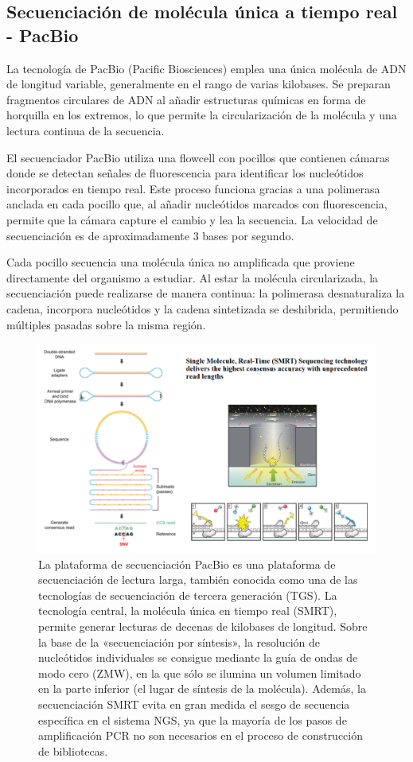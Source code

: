 \begin{itemize}
\section{Secuenciación de molécula única a tiempo real - PacBio}
La tecnología de PacBio (Pacific Biosciences) emplea una única molécula de ADN de longitud variable, generalmente en el rango de varias kilobases. Se preparan fragmentos circulares de ADN al añadir estructuras químicas en forma de horquilla en los extremos, lo que permite la circularización de la molécula y una lectura continua de la secuencia.

El secuenciador PacBio utiliza una flowcell con pocillos que contienen cámaras donde se detectan señales de fluorescencia para identificar los nucleótidos incorporados en tiempo real. Este proceso funciona gracias a una polimerasa anclada en cada pocillo que, al añadir nucleótidos marcados con fluorescencia, permite que la cámara capture el cambio y lea la secuencia. La velocidad de secuenciación es de aproximadamente 3 bases por segundo.

Cada pocillo secuencia una molécula única no amplificada que proviene directamente del organismo a estudiar. Al estar la molécula circularizada, la secuenciación puede realizarse de manera continua: la polimerasa desnaturaliza la cadena, incorpora nucleótidos y la cadena sintetizada se deshibrida, permitiendo múltiples pasadas sobre la misma región.

\begin{figure}[htbp]
\centering
\includegraphics[width = \textwidth]{figs/pacbio.png}
\caption{La plataforma de secuenciación PacBio es una plataforma de secuenciación de lectura larga, también conocida como una de las tecnologías de secuenciación de tercera generación (TGS). La tecnología central, la molécula única en tiempo real (SMRT), permite generar lecturas de decenas de kilobases de longitud. Sobre la base de la «secuenciación por síntesis», la resolución de nucleótidos individuales se consigue mediante la guía de ondas de modo cero (ZMW), en la que sólo se ilumina un volumen limitado en la parte inferior (el lugar de síntesis de la molécula). Además, la secuenciación SMRT evita en gran medida el sesgo de secuencia específica en el sistema NGS, ya que la mayoría de los pasos de amplificación PCR no son necesarios en el proceso de construcción de bibliotecas.}
\end{figure}


\end{itemize}

